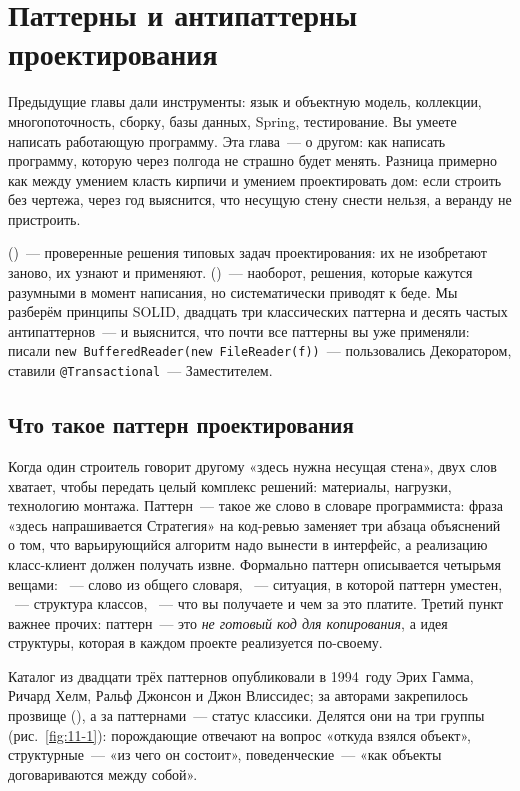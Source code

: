 \chapter{Паттерны и антипаттерны проектирования}
\label{ch:11}

Предыдущие главы дали инструменты: язык и объектную модель, коллекции,
многопоточность, сборку, базы данных, Spring, тестирование. Вы умеете написать
работающую программу. Эта глава~--- о другом: как написать программу, которую
через полгода не страшно будет менять. Разница примерно как между умением класть
кирпичи и умением проектировать дом: если строить без чертежа, через год
выяснится, что несущую стену снести нельзя, а веранду не пристроить.

 ()~--- проверенные решения
типовых задач проектирования: их не изобретают заново, их узнают и применяют.
 ()~--- наоборот, решения, которые кажутся
разумными в момент написания, но систематически приводят к беде. Мы разберём
принципы SOLID, двадцать три классических паттерна и десять частых
антипаттернов~--- и выяснится, что почти все паттерны вы уже применяли: писали
\texttt{new BufferedReader(new FileReader(f))}~--- пользовались Декоратором,
ставили \texttt{@Transactional}~--- Заместителем.

\section{Что такое паттерн проектирования}

Когда один строитель говорит другому «здесь нужна несущая стена», двух слов
хватает, чтобы передать целый комплекс решений: материалы, нагрузки, технологию
монтажа. Паттерн~--- такое же слово в словаре программиста: фраза «здесь
напрашивается Стратегия» на код-ревью заменяет три абзаца объяснений о том, что
варьирующийся алгоритм надо вынести в интерфейс, а реализацию класс-клиент
должен получать извне. Формально паттерн описывается четырьмя вещами:
~--- слово из общего словаря, ~--- ситуация, в
которой паттерн уместен, ~--- структура классов,
~--- что вы получаете и чем за это платите. Третий пункт
важнее прочих: паттерн~--- это \emph{не готовый код для копирования}, а идея
структуры, которая в каждом проекте реализуется по-своему.

Каталог из двадцати трёх паттернов опубликовали в 1994~году Эрих Гамма, Ричард
Хелм, Ральф Джонсон и Джон Влиссидес; за авторами закрепилось прозвище
 (), а за паттернами~--- статус
классики. Делятся они на три группы (рис.~\ref{fig:11-1}): порождающие отвечают
на вопрос «откуда взялся объект», структурные~--- «из чего он состоит»,
поведенческие~--- «как объекты договариваются между собой».

